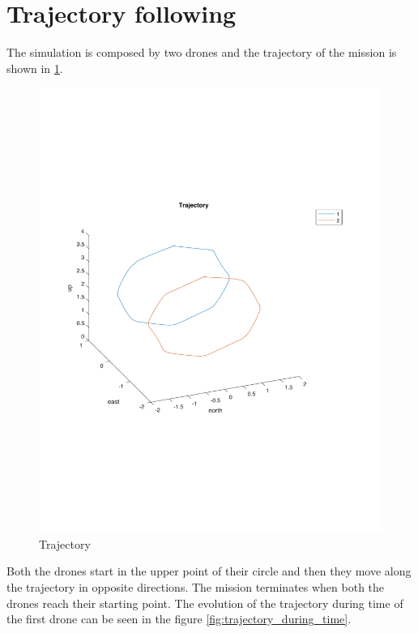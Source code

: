 \section{Trajectory following}

The simulation is composed by two drones and the trajectory of the mission is shown
in \ref{fig:trajectory}.

\begin{figure}[h]
\centering
\includegraphics[width=1.0\textwidth]{chapters/chapter-04/figures/trajectory.pdf}
\caption{Trajectory}
\label{fig:trajectory}
\end{figure}

Both the drones start in the upper point of their circle and then they move along the
trajectory in opposite directions. The mission terminates when both the drones reach
their starting point.
The evolution of the trajectory during time of the first drone can be seen in the figure
\ref{fig:trajectory_during_time}.

